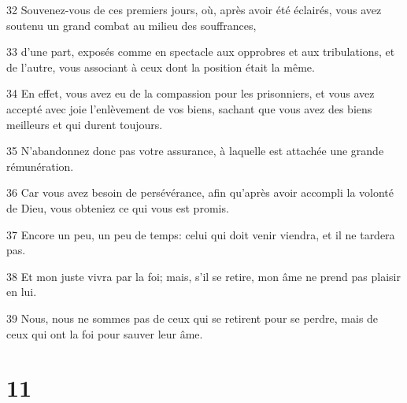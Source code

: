 \par 32 Souvenez-vous de ces premiers jours, où, après avoir été éclairés, vous avez soutenu un grand combat au milieu des souffrances,
\par 33 d'une part, exposés comme en spectacle aux opprobres et aux tribulations, et de l'autre, vous associant à ceux dont la position était la même.
\par 34 En effet, vous avez eu de la compassion pour les prisonniers, et vous avez accepté avec joie l'enlèvement de vos biens, sachant que vous avez des biens meilleurs et qui durent toujours.
\par 35 N'abandonnez donc pas votre assurance, à laquelle est attachée une grande rémunération.
\par 36 Car vous avez besoin de persévérance, afin qu'après avoir accompli la volonté de Dieu, vous obteniez ce qui vous est promis.
\par 37 Encore un peu, un peu de temps: celui qui doit venir viendra, et il ne tardera pas.
\par 38 Et mon juste vivra par la foi; mais, s'il se retire, mon âme ne prend pas plaisir en lui.
\par 39 Nous, nous ne sommes pas de ceux qui se retirent pour se perdre, mais de ceux qui ont la foi pour sauver leur âme.

\chapter{11}

